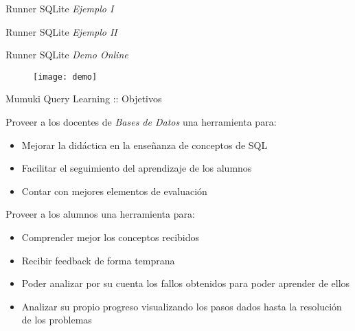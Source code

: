 \documentclass{beamer}
\begin{document}
\begin{frame}[fragile]
    {Runner SQLite}
    {\emph{Ejemplo I}}

    

\end{frame}

\begin{frame}[fragile]
    {Runner SQLite}
    {\emph{Ejemplo II}}

    

\end{frame}

\begin{frame}
    {Runner SQLite}
    {\emph{Demo Online}}


    \begin{figure}[h]
        \texttt{[image: demo]}
    \end{figure}

\end{frame}

\begin{frame}
    {Mumuki Query Learning :: Objetivos}

    Proveer a los docentes de \textit{Bases de Datos} una herramienta para:

    \begin{itemize}
        \item Mejorar la didáctica en la enseñanza de conceptos de SQL
        \item Facilitar el seguimiento del aprendizaje de los alumnos
        \item Contar con mejores elementos de evaluación
    \end{itemize}

    \vspace{1em}

    Proveer a los alumnos una herramienta para:

    \begin{itemize}
        \item Comprender mejor los conceptos recibidos
        \item Recibir feedback de forma temprana
        \item Poder analizar por su cuenta los fallos obtenidos para poder aprender de ellos
        \item Analizar su propio progreso visualizando los pasos dados hasta la resolución de los problemas
    \end{itemize}
\end{frame}
\end{document}
